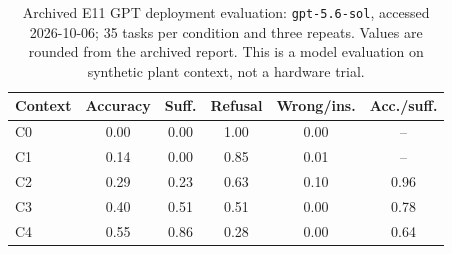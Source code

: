 \begin{table}[t]
\centering\footnotesize
\caption{Archived E11 GPT deployment evaluation: \texttt{gpt-5.6-sol}, accessed 2026-10-06; 35 tasks per condition and three repeats. Values are rounded from the archived report. This is a model evaluation on synthetic plant context, not a hardware trial.}
\label{tab:revision-e11}
\begin{tabular}{@{}lccccc@{}}
\toprule
Context & Accuracy & Suff. & Refusal & Wrong/ins. & Acc./suff. \\
\midrule
C0 & 0.00 & 0.00 & 1.00 & 0.00 & -- \\
C1 & 0.14 & 0.00 & 0.85 & 0.01 & -- \\
C2 & 0.29 & 0.23 & 0.63 & 0.10 & 0.96 \\
C3 & 0.40 & 0.51 & 0.51 & 0.00 & 0.78 \\
C4 & 0.55 & 0.86 & 0.28 & 0.00 & 0.64 \\
\bottomrule
\end{tabular}
\end{table}